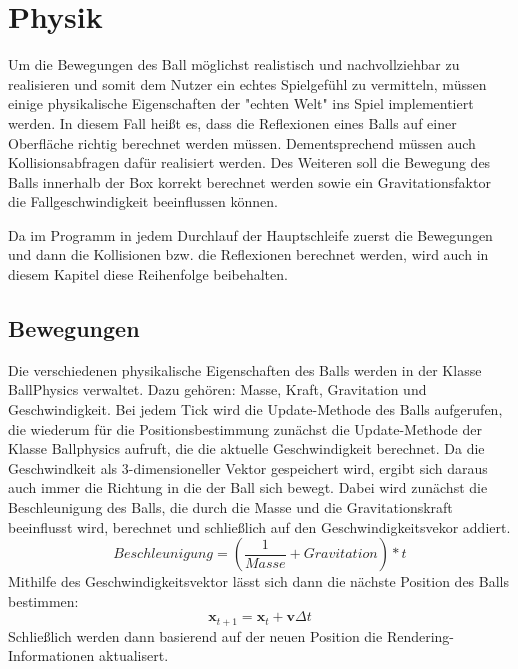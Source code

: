 \chapter{Physik}
\label{Kapitel 4}

Um die Bewegungen des Ball möglichst realistisch und nachvollziehbar zu realisieren und somit dem Nutzer ein echtes Spielgefühl zu vermitteln, müssen einige physikalische Eigenschaften der "{}echten Welt"{} ins Spiel implementiert werden. In diesem Fall heißt es, dass die Reflexionen eines Balls auf einer Oberfläche richtig berechnet werden müssen. Dementsprechend müssen auch Kollisionsabfragen dafür realisiert werden. Des Weiteren soll die Bewegung des Balls innerhalb der Box korrekt berechnet werden sowie ein Gravitationsfaktor die Fallgeschwindigkeit beeinflussen können.

Da im Programm in jedem Durchlauf der Hauptschleife zuerst die Bewegungen und dann die Kollisionen bzw. die Reflexionen berechnet werden, wird auch in diesem Kapitel diese Reihenfolge beibehalten.
\section{Bewegungen}
\label{Kapitel_4_-_Unterkapitel_1}
Die verschiedenen physikalische Eigenschaften des Balls werden in der Klasse BallPhysics verwaltet. Dazu gehören: Masse, Kraft, Gravitation und Geschwindigkeit.
Bei jedem Tick wird die Update-Methode des Balls aufgerufen, die wiederum für die Positionsbestimmung zunächst die Update-Methode der Klasse Ballphysics aufruft, die die aktuelle Geschwindigkeit berechnet. Da die Geschwindkeit als 3-dimensioneller Vektor gespeichert wird, ergibt sich daraus auch immer die Richtung in die der Ball sich bewegt. Dabei wird zunächst die Beschleunigung des Balls, die durch die Masse und die Gravitationskraft beeinflusst wird, berechnet und schließlich auf den Geschwindigkeitsvekor addiert.
 \begin{equation}
	    \label{beschleunigung}
	    Beschleunigung = (\frac{1}{Masse} + Gravitation) * t 
    \end{equation}
Mithilfe des Geschwindigkeitsvektor lässt sich dann die nächste Position des Balls bestimmen:
\begin{equation}
	    \label{beschleunigung}
	   \mathbf{x}_{t+1} = \mathbf{x}_{t} + \mathbf{v}\Delta t 
    \end{equation}
Schließlich werden dann basierend auf der neuen Position die Rendering-Informationen aktualisert. 


